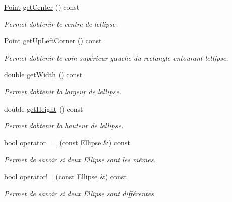 \begin{DoxyCompactItemize}
\hyperlink{classPoint}{Point} \hyperlink{classEllipse_ab2c87589547fef01242fc0b8eb8de4f6}{get\+Center} () const 
\begin{DoxyCompactList}\small\item\em Permet d\textquotesingle{}obtenir le centre de l\textquotesingle{}ellipse. \end{DoxyCompactList}\item 
\hyperlink{classPoint}{Point} \hyperlink{classEllipse_a39cf837aa97029fb3aef3e769586c084}{get\+Up\+Left\+Corner} () const 
\begin{DoxyCompactList}\small\item\em Permet d\textquotesingle{}obtenir le coin supérieur gauche du rectangle entourant l\textquotesingle{}ellipse. \end{DoxyCompactList}\item 
double \hyperlink{classEllipse_a1aad73090801cc4b60b8c1508095ccf5}{get\+Width} () const 
\begin{DoxyCompactList}\small\item\em Permet d\textquotesingle{}obtenir la largeur de l\textquotesingle{}ellipse. \end{DoxyCompactList}\item 
double \hyperlink{classEllipse_aafb4efaa85efaf59e553c7423aa47b37}{get\+Height} () const 
\begin{DoxyCompactList}\small\item\em Permet d\textquotesingle{}obtenir la hauteur de l\textquotesingle{}ellipse. \end{DoxyCompactList}\item 
bool \hyperlink{classEllipse_ac06ebff3c587e85f15ca6f5f754bb35e}{operator==} (const \hyperlink{classEllipse}{Ellipse} \&) const 
\begin{DoxyCompactList}\small\item\em Permet de savoir si deux \hyperlink{classEllipse}{Ellipse} sont les mêmes. \end{DoxyCompactList}\item 
bool \hyperlink{classEllipse_a06f16be297b055c46f6ede471ea6ffad}{operator!=} (const \hyperlink{classEllipse}{Ellipse} \&) const 
\begin{DoxyCompactList}\small\item\em Permet de savoir si deux \hyperlink{classEllipse}{Ellipse} sont différentes. \end{DoxyCompactList}\end{DoxyCompactItemize}
